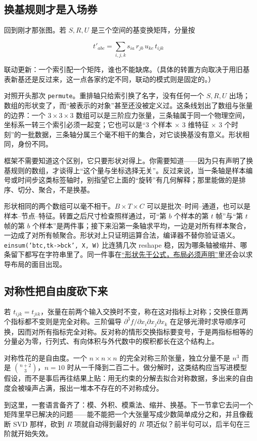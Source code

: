 \subsection{换基规则才是入场券}

回到刚才那张图。若 \(S,R,U\) 是三个空间的基变换矩阵，分量按

\[
t'_{abc}=\sum_{i,j,k}s_{ia}\,r_{jb}\,u_{kc}\,t_{ijk}
\]

联动更新：一个索引配一个矩阵，谁也不能缺席。（具体的转置方向取决于用旧基表新基还是反过来，这一点各家约定不同，联动的模式则是固定的。）

对照开头那次 \texttt{permute}。重排轴只给索引换了名字，没有任何一个 \(S,R,U\) 出场；数组的形状变了，而``被表示的对象''甚至还没被定义过。这条线划出了数组与张量的边界：一个 \(3\times3\times3\) 数组可以是三阶应力张量，三条轴属于同一个物理空间，坐标系一转三个索引必须一起变；它也可以是``3 个样本 \(\times\) 3 维特征 \(\times\) 3 个时刻''的一批数据，三条轴分属三个毫不相干的集合，对它谈换基没有意义。形状相同，身份不同。

框架不需要知道这个区别，它只要形状对得上。你需要知道——因为只有声明了换基规则的数组，才谈得上``这个量与坐标选择无关''。反过来说，当一条轴是样本编号或时间步这类标签轴时，别指望它上面的``旋转''有几何解释；那里能做的是排序、切分、聚合，不是换基。

\begin{remark}
形状相同的两个数组可以毫不相干。\(B\times T\times C\) 可以是批次--时间--通道，也可以是样本--节点--特征。转置之后尺寸检查照样通过，可``第 \(b\) 个样本的第 \(t\) 帧''与``第 \(t\) 帧的第 \(b\) 个样本''是两件事；接下来沿第一条轴求平均，一边是对所有样本聚合，一边成了对所有帧聚合。形状对上只证明运算合法，编译器不替你验证语义。\texttt{einsum('btc,tk->bck', X, W)} 比连猜几次 reshape 稳，因为哪条轴被缩并、哪条留下都写在字符串里了。同一件事在\hyperref[sec:10-Matrix-Calculus/01-Derivative-Conventions/02]{``形状先于公式，布局必须声明''}里还会以求导布局的面目出现。
\end{remark}

\subsection{对称性把自由度砍下来}

若 \(t_{ijk}=t_{jik}\)，张量在前两个输入交换时不变，称在这对指标上对称；交换任意两个指标都不变则是完全对称。三阶偏导 \(\partial^3f/\partial x_i\partial x_j\partial x_k\) 在足够光滑时求导顺序可换，因而对所有指标完全对称。反对称的情形交换指标要变号，于是两指标相等的分量必为零，行列式、有向体积与外代数中的楔积都长在这个结构上。

对称性花的是自由度。一个 \(n\times n\times n\) 的完全对称三阶张量，独立分量不是 \(n^3\) 而是 \(\binom{n+2}{3}\)，\(n=10\) 时从一千降到二百二十。做分解时，这类结构应当写进模型假设，而不是事后再往结果上贴：用无约束的分解去拟合对称数据，多出来的自由度会被噪声占满，报出一堆本不存在的不对称成分。

到这里，一套语言备齐了：模、外积、模乘法、缩并、换基。下一节拿它去问一个矩阵里早已解决的问题——能不能把一个大张量写成少数简单成分之和，并且像截断 SVD 那样，砍到 \(R\) 项就自动得到最好的 \(R\) 项近似？前半句可以，后半句在三阶就开始失效。
